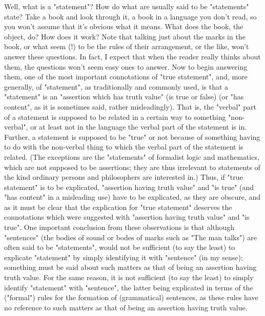 \documentclass[10pt,twoside]{memoir}
\begin{document}
\begin{enumerate}
Well, what is a "statement"? How do what are usually said to be 
"statements" state? Take a book and look through it, a book in a language 
you don't read, so you won't assume that it's obvious what it means. What 
does the book, the object, do? How does it work? Note that talking just 
about the marks in the book, or what seem (!) to be the rules of their 
arrangement, or the like, won't answer these questions. In fact, I expect that 
when the reader really thinks about them, the questions won't seem easy 
ones to answer. Now to begin answering them, one of the most important 
connotations of "true statement", and, more generally, of "statement", as 
traditionally and commonly used, is that a "statement" is an "assertion 
which has truth value" (is true or false) (or "has content", as it is sometimes 
said, rather misleadingly). That is, the "verbal" part of a statement is 
supposed to be related in a certain way to something "non-verbal", or at 
least not in the language the verbal part of the statement is in. Further, a 
statement is supposed to be "true" or not because of something having to do 
with the non-verbal thing to which the verbal part of the statement is 
related. (The exceptions are the "statements" of formalist logic and 
mathematics, which are not supposed to be assertions; they are thus 
irrelevant to statements of the kind ordinary persons and philosophers are 
interested in.) Thus, if "true statement" is to be explicated, "assertion having 
truth value" and "is true" (and "has content" in a misleading use) have to be 
explicated, as they are obscure, and as it must be clear that the explication 
for "true statement" deserves the connotations which were suggested with 
"assertion having truth value" and "is true". One important conclusion from 
these observations is that although "sentences" (the bodies of sound or 
bodes of marks such as "The man talks") are often said to be "statements", 
would not be sufficient (to say the least) to explicate "statement" by simply 
identifying it with "sentence" (in my sense); something must be said about 
such matters as that of being an assertion having truth value. For the same 
reason, it is not sufficient (to say the least) to simply identify "statement" 
with "sentence", the latter being explicated in terms of the ("formal") rules 
for the formation of (grammatical) sentences, as these rules have no 
reference to such matters as that of being an assertion having truth value. 


\end{enumerate}
\end{document}
